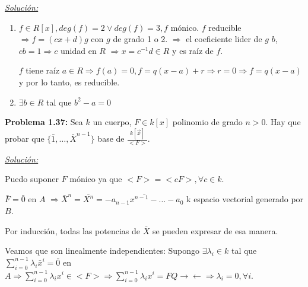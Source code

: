\underline{\textit{Solución: }}

\begin{enumerate}
\item $f\in R[x], deg(f)=2 \vee deg(f)=3, f$ mónico. $f$ reducible $\Rightarrow f=(cx+d)g$ con $g$ de grado 1 o 2. $\Rightarrow $ el coeficiente lider de $g$ $b$, $cb=1 \Rightarrow  c$ unidad en $R$ $\Rightarrow x=c^{-1}d\in R$ y es raíz de $f$.

$f$ tiene raíz $a\in R \Rightarrow f(a)=0, f=q(x-a)+r \Rightarrow r=0 \Rightarrow f=q(x-a)$ y por lo tanto, es reducible.

\item $\exists b \in R$ tal que $b^2-a=0$
\end{enumerate}

\textbf{Problema 1.37: } Sea $k$ un cuerpo, $F\in k[x]$ polinomio de grado $n>0$. Hay que probar que $\{\bar{1},\dots,\bar{X}^{n-1}\}$ base de $\frac{k[\vec{x}]}{<F>}$.

\underline{\textit{Solución: }}

Puedo suponer $F$ mónico ya que $<F>=<cF>, \forall c \in k$.

$\bar{F}=\bar{0}$ en $A$ $\Rightarrow \bar{X}^n=\bar{X^n}=\bar{-a_{n-1}x^{n-1}-\dots -a_0}$ k espacio vectorial generado por $B$.

Por inducción, todas las potencias de $\bar{X}$ se pueden expresar de esa manera. 

Veamos que son linealmente independientes: Supongo $\exists \lambda_i\in k$ tal que $\sum_{i=0}^{n-1}\lambda_i\bar{x}^i=\bar{0}$ en $A \Rightarrow \sum_{i=0}^{n-1}\lambda_ix^i\in <F> \Rightarrow \sum_{i=0}^{n-1}\lambda_ix^i=FQ \rightarrow \leftarrow \Rightarrow \lambda_i=0, \forall i$.

